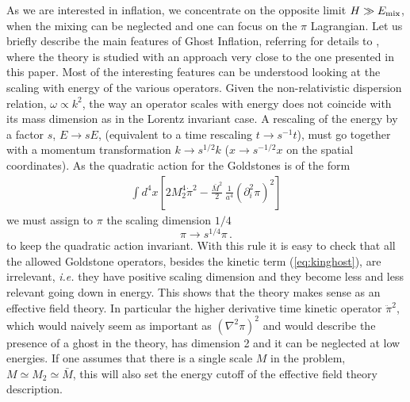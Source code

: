 \documentclass[12pt,letterpaper]{article}
\def\be{\begin{eqnarray}}
\def\ee{\end{eqnarray}}
\newcommand{\di}{\partial}
\begin{document}
{As we are interested in inflation, we concentrate on the opposite
limit $H \gg E_{\rm mix}$, when the mixing can be neglected and one
can focus on the $\pi$ Lagrangian. Let us briefly describe the main features of Ghost Inflation, referring for details to 
\cite{Arkani-Hamed:2003uy,Arkani-Hamed:2003uz,Senatore:2004rj}, where
the theory is studied with an approach very close to the one presented
in this paper. Most of the
interesting features can be understood looking at the scaling with
energy of the various operators.  Given the
non-relativistic dispersion relation, $\omega \propto k^2$, the
way an operator scales with energy does not coincide with its mass dimension as in the Lorentz invariant case. 
A rescaling of the energy by a factor $s$, $E\rightarrow s E$,  (equivalent
to a time rescaling $t\rightarrow s^{-1} t$), must go together with a
momentum transformation $k\rightarrow s^{1/2}k$ ($x\rightarrow
s^{-1/2}x$ on the spatial coordinates). As the quadratic action for
the Goldstones is of the form
\be
\label{eq:kinghost}
\int d^4 x \left[ 2 M_2^4 \dot\pi^2 - \frac{\bar M^2}{2} \,
  \frac{1}{a^4}(\di_i^2 \pi)^2 \right]
\ee
we must assign to  $\pi$ the scaling dimension $1/4$
\begin{equation}
\pi\rightarrow s^{1/4}\pi \, .
\end{equation}
to keep the quadratic action invariant. With this rule it is easy to
check that all the allowed Goldstone operators, besides the kinetic
term (\ref{eq:kinghost}), are irrelevant, {\em i.e.} they have
positive scaling dimension and they become less and less relevant
going down in energy. This shows that the theory makes sense as an
effective field theory. In particular the higher derivative
time kinetic operator $\ddot \pi^2$, which would naively seem as
important as $(\nabla^2\pi)^2$ and would describe the presence of a
ghost in the theory, has dimension 2 and it can be neglected
at low energies. If one assumes that there is a single scale $M$ in the
problem, $M \simeq M_2 \simeq \bar M$, this will also set the energy cutoff of the
effective field theory description.





}
\end{document}

